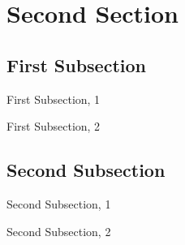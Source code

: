 \documentclass[
	10pt, t,
	hyperref={
		colorlinks,
		citecolor=CtpLatteTeal,
		linkcolor=CtpLatteTeal,
		urlcolor=CtpLatteBlue,
		pdfauthor={},
		pdftitle={},
		pdfsubject={},
		pdfkeywords={},
		pdfcreator={},
		pdfproducer={}
		},
	aspectratio=1610,
	]
	{beamer}
\begin{document}
\section{Second Section}
\subsection{First Subsection}
\begin{frame}{First Subsection, 1}

\end{frame}
\begin{frame}{First Subsection, 2}

\end{frame}
\subsection{Second Subsection}
\begin{frame}{Second Subsection, 1}

\end{frame}
\begin{frame}{Second Subsection, 2}

\end{frame}



% 
% 
\end{document}
